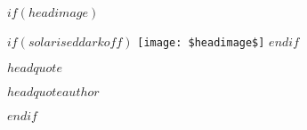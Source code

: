 
$if(headimage)$
\begin{marginfigure}
$if(solariseddarkoff)$
\texttt{[image: \$headimage\$]}
$endif$
\epigraph{$headquote$}{\textit{$headquoteauthor$}}
\end{marginfigure}
$endif$


